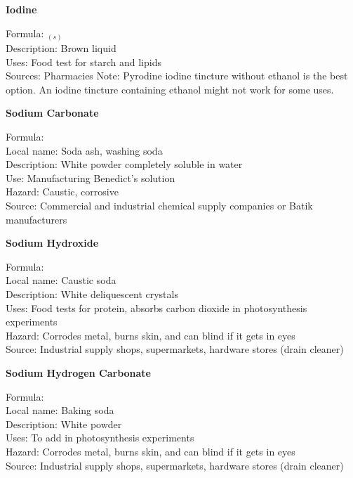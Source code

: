\begin{flushleft}
\textbf{Iodine}
\end{flushleft}
\vspace{-10pt}
Formula: $_{(s)}$\\
Description: Brown liquid\\
Uses: Food test for starch and lipids\\
Sources: Pharmacies
Note: Pyrodine iodine tincture without ethanol is the best option. An iodine tincture containing ethanol might not work for some uses.

\begin{flushleft}
\textbf{Sodium Carbonate}
\end{flushleft}
\vspace{-10pt}
Formula: \\
Local name: Soda ash, washing soda\\
Description: White powder completely soluble in water\\
Use: Manufacturing Benedict's solution\\
Hazard: Caustic, corrosive\\
Source: Commercial and industrial chemical supply companies or Batik manufacturers\\

\begin{flushleft}
\textbf{Sodium Hydroxide}
\end{flushleft}
\vspace{-10pt}
Formula: \\
Local name: Caustic soda\\
Description: White deliquescent crystals \\
Uses: Food tests for protein, absorbs carbon dioxide in photosynthesis experiments\\
Hazard: Corrodes metal, burns skin, and can blind if it gets in eyes\\
Source: Industrial supply shops, supermarkets, hardware stores (drain cleaner)\\

\begin{flushleft}
\textbf{Sodium Hydrogen Carbonate}
\end{flushleft}
\vspace{-10pt}
Formula: \\
Local name: Baking soda\\
Description: White powder \\
Uses: To add  in photosynthesis experiments\\
Hazard: Corrodes metal, burns skin, and can blind if it gets in eyes\\
Source: Industrial supply shops, supermarkets, hardware stores (drain cleaner)
